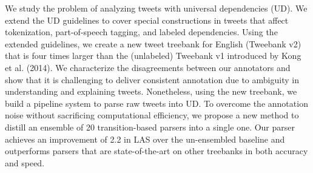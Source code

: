 We study the problem of analyzing tweets with universal dependencies (UD). We extend the UD guidelines to cover special constructions in tweets that affect tokenization, part-of-speech tagging, and labeled dependencies. Using the extended guidelines, we create a new tweet treebank for English (Tweebank v2) that is four times larger than the (unlabeled) Tweebank v1 introduced by Kong et al. (2014). We characterize the disagreements between our annotators and show that it is challenging to deliver consistent annotation due to ambiguity in understanding and explaining tweets. Nonetheless, using the new treebank, we build a pipeline system to parse raw tweets into UD. To overcome the annotation noise without sacrificing computational efficiency, we propose a new method to distill an ensemble of 20 transition-based parsers into a single one. Our parser achieves an improvement of 2.2 in LAS over the un-ensembled baseline and outperforms parsers that are state-of-the-art on other treebanks in both accuracy and speed.

